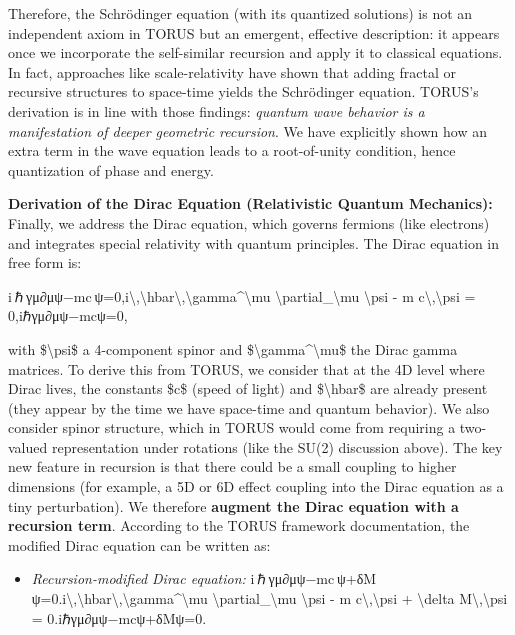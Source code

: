 \documentclass[
]{article}
\begin{document}
Therefore, the Schrödinger equation (with its quantized solutions) is
not an independent axiom in TORUS but an emergent, effective
description: it appears once we incorporate the self-similar recursion
and apply it to classical equations\hspace{0pt}. In fact, approaches
like scale-relativity have shown that adding fractal or recursive
structures to space-time yields the Schrödinger equation\hspace{0pt}.
TORUS's derivation is in line with those findings: \emph{quantum wave
behavior is a manifestation of deeper geometric recursion}. We have
explicitly shown how an extra term in the wave equation leads to a
root-of-unity condition, hence quantization of phase and energy.

\textbf{Derivation of the Dirac Equation (Relativistic Quantum
Mechanics):} Finally, we address the Dirac equation, which governs
fermions (like electrons) and integrates special relativity with quantum
principles. The Dirac equation in free form is:

i ℏ γμ∂μψ−mc ψ=0,i\textbackslash,\textbackslash hbar\textbackslash,\textbackslash gamma\^{}\textbackslash mu
\textbackslash partial\_\textbackslash mu \textbackslash psi - m
c\textbackslash,\textbackslash psi = 0,iℏγμ∂μ\hspace{0pt}ψ−mcψ=0,

with \$\textbackslash psi\$ a 4-component spinor and
\$\textbackslash gamma\^{}\textbackslash mu\$ the Dirac gamma matrices.
To derive this from TORUS, we consider that at the 4D level where Dirac
lives, the constants \$c\$ (speed of light) and \$\textbackslash hbar\$
are already present (they appear by the time we have space-time and
quantum behavior). We also consider spinor structure, which in TORUS
would come from requiring a two-valued representation under rotations
(like the SU(2) discussion above). The key new feature in recursion is
that there could be a small coupling to higher dimensions (for example,
a 5D or 6D effect coupling into the Dirac equation as a tiny
perturbation). We therefore \textbf{augment the Dirac equation with a
recursion term}. According to the TORUS framework documentation, the
modified Dirac equation can be written as\hspace{0pt}:

\begin{itemize}
\item
  \emph{Recursion-modified Dirac equation:}
  i ℏ γμ∂μψ−mc ψ+δM ψ=0.i\textbackslash,\textbackslash hbar\textbackslash,\textbackslash gamma\^{}\textbackslash mu
  \textbackslash partial\_\textbackslash mu \textbackslash psi - m
  c\textbackslash,\textbackslash psi + \textbackslash delta
  M\textbackslash,\textbackslash psi = 0.iℏγμ∂μ\hspace{0pt}ψ−mcψ+δMψ=0.
\end{itemize}
\end{document}
